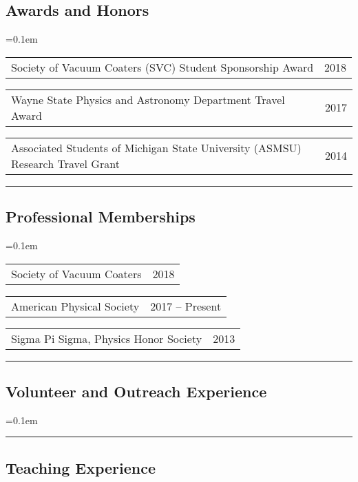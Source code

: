 \documentclass[10pt,letterpaper]{article}
\makeatletter
\newcommand{\headerrow}[2]
{\begin{tabular*}{\linewidth}{l@{\extracolsep{\fill}}r}
	#1 &
	#2 \\
\end{tabular*}}
\makeatother
\begin{document}
\subsection*{Awards and Honors}
	
	\begin{itemize*}
		\parskip=0.1em
		\item[]
			\headerrow
			{Society of Vacuum Coaters (SVC) Student Sponsorship Award}
			{2018}

		\item[]
			\headerrow
			{Wayne State Physics and Astronomy Department Travel Award}
			{2017}

		\item[]
			\headerrow
			{Associated Students of Michigan State University (ASMSU) Research Travel Grant}
			{2014}
	\end{itemize*}

\hrule
\vspace{-0.4em}
\subsection*{Professional Memberships}

	\begin{itemize*}
		\parskip=0.1em
		\item[]
		\headerrow
			{Society of Vacuum Coaters}
			{2018}

		\item[]
		\headerrow
			{American Physical Society}
			{2017 -- Present}

		\item[]
		\headerrow
			{Sigma Pi Sigma, Physics Honor Society}
			{2013}

	\end{itemize*}

\hrule
\vspace{-0.4em}
\subsection*{Volunteer and Outreach Experience}

	\begin{itemize*}
		\parskip=0.1em
		\item[]

	\end{itemize*}

\hrule
\vspace{-0.4em}
\subsection*{Teaching Experience}
\end{document}
